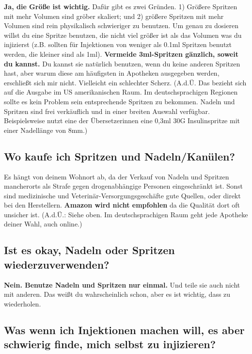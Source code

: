 \documentclass{article}
\begin{document}
\textbf{Ja, die Größe ist wichtig.} Dafür gibt es zwei Gründen. 1) Größere Spritzen mit mehr Volumen sind gröber skaliert; und 2) größere Spritzen mit mehr Volumen sind rein physikalisch schwieriger zu benutzen. Um genau zu dosieren willst du eine Spritze benutzen, die nicht viel größer ist als das Volumen was du injizierst (z.B. sollten für Injektionen von weniger als 0.1ml Spritzen benutzt werden, die kleiner sind als 1ml). \textbf{Vermeide 3ml-Spritzen gänzlich, soweit du kannst.} Du kannst sie natürlich benutzen, wenn du keine anderen Spritzen hast, aber warum diese am häufigsten in Apotheken ausgegeben werden, erschließt sich mir nicht. Vielleicht ein schlechter Scherz. (A.d.Ü. Das bezieht sich auf die Ausgabe im US amerikanischen Raum. Im deutschsprachigen Regionen sollte es kein Problem sein entsprechende Spritzen zu bekommen. Nadeln und Spritzen sind frei verkäuflich und in einer breiten Auswahl verfügbar. Beispielsweise nutzt eine der Übersetzerinnen eine 0,3ml 30G Insulinspritze mit einer Nadellänge von 8mm.)

\subsection{Wo kaufe ich Spritzen und Nadeln/Kanülen?}

Es hängt von deinem Wohnort ab, da der Verkauf von Nadeln und Spritzen mancherorts als Strafe gegen drogenabhängige Personen eingeschränkt ist. Sonst sind medizinische und Veterinär-Versorgungsgeschäfte gute Quellen, oder direkt bei den Herstellern. \textbf{Amazon wird nicht empfohlen} da die Qualität dort oft unsicher ist. (A.d.Ü.: Siehe oben. Im deutschsprachigen Raum geht jede Apotheke deiner Wahl, auch online.)

\subsection{Ist es okay, Nadeln oder Spritzen wiederzuverwenden?}

\textbf{Nein. Benutze Nadeln und Spritzen nur einmal. }Und teile sie auch nicht mit anderen. Das weißt du wahrscheinlich schon, aber es ist wichtig, dass zu wiederholen.

\subsection{Was wenn ich Injektionen machen will, es aber schwierig finde, mich selbst zu injizieren?}\label{5-21}
\end{document}
